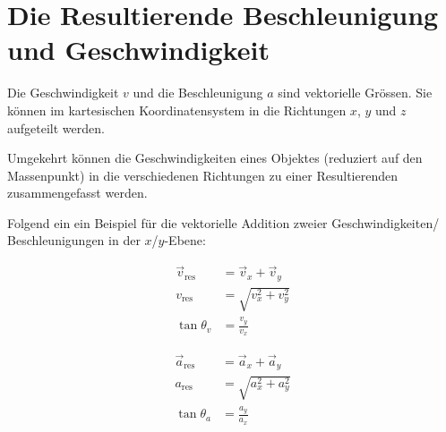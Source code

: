 \section{Die Resultierende Beschleunigung und Geschwindigkeit}

Die Geschwindigkeit $v$ und die Beschleunigung $a$ sind vektorielle Grössen. Sie können im 
kartesischen Koordinatensystem in die Richtungen $x$, $y$ und $z$ aufgeteilt werden.

Umgekehrt können die Geschwindigkeiten eines Objektes (reduziert auf den Massenpunkt) in die 
verschiedenen Richtungen zu einer Resultierenden zusammengefasst werden.

\begin{bspbox}
    Folgend ein ein Beispiel für die vektorielle Addition 
    zweier Geschwindigkeiten/ Beschleunigungen in der $x$/$y$-Ebene:

    \begin{minipage}{.48\textwidth}
        \begin{equbox}
            \begin{align*}
                \vec{v}_{\text{res}} &= \vec{v}_x + \vec{v}_y \\
                v_{\text{res}} &= \sqrt{v_x^2 + v_y^2} \\
                \tan \theta_v &= \frac{v_y}{v_x}
            \end{align*}
        \end{equbox}
    \end{minipage}
    \hspace{.04\textwidth}
    \begin{minipage}{.48\textwidth}
        \begin{equbox}
            \begin{align*}
                \vec{a}_{\text{res}} &= \vec{a}_x + \vec{a}_y \\
                a_{\text{res}} &= \sqrt{a_x^2 + a_y^2} \\
                \tan \theta_a &= \frac{a_y}{a_x}
            \end{align*}
        \end{equbox}
\end{minipage}
\end{bspbox}
